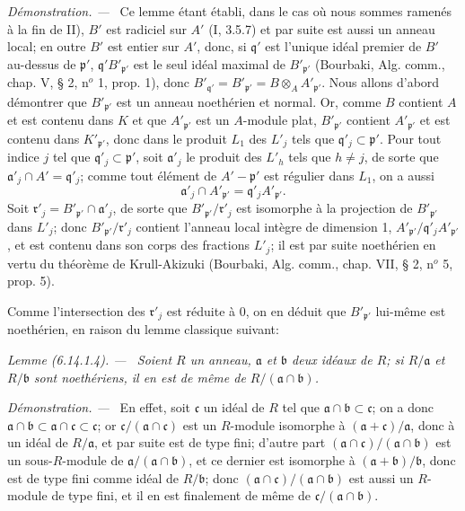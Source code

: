 \documentclass[10pt,oneside]{book}
\newcommand{\oldpage}[2][]{%
  \setcounter{footnote}{0}%
  \marginpar{\scriptsize\textbf{#1}~|~#2}\ignorespaces}
\newenvironment{lemma}[1][]{%
  \par\medskip\noindent\itshape Lemme (#1). ---\ }{\par}
\newenvironment{proof}{%
  \par\medskip\noindent\textit{Démonstration. ---\ }}{\par}
\begin{document}
\begin{proof}
Ce lemme étant établi, dans le cas où nous sommes ramenés à la fin de II),
$B'$ est radiciel sur $A'$ (I, 3.5.7) et par suite est aussi un anneau
local; en outre $B'$ est entier sur $A'$, donc, si $\mathfrak q'$ est
l'unique idéal premier de $B'$ au-dessus de $\mathfrak p'$,
$\mathfrak q'B'_{\mathfrak p'}$ est le seul idéal maximal de
$B'_{\mathfrak p'}$ (Bourbaki, Alg. comm., chap. V, § 2, n$^o$ 1, prop.
1), donc $B'_{\mathfrak q'}=B'_{\mathfrak p'}=B\otimes_A
A'_{\mathfrak p'}$. Nous allons d'abord démontrer que
$B'_{\mathfrak p'}$ est un anneau noethérien et normal. Or, comme $B$
contient $A$ et est contenu dans $K$ et que $A'_{\mathfrak p'}$ est un
$A$-module plat, $B'_{\mathfrak p'}$ contient $A'_{\mathfrak p'}$ et est
contenu dans $K'_{\mathfrak p'}$, donc dans le produit $L_1$ des $L'_j$
tels que $\mathfrak q'_j\subset\mathfrak p'$. Pour tout indice $j$ tel que
$\mathfrak q'_j\subset\mathfrak p'$, soit $\mathfrak a'_j$ le produit des
$L'_h$ tels que $h\neq j$, de sorte que
$\mathfrak a'_j\cap A'=\mathfrak q'_j$; comme tout élément de
$A'-\mathfrak p'$ est régulier dans $L_1$, on a aussi
\[
\mathfrak a'_j\cap A'_{\mathfrak p'}=
\mathfrak q'_jA'_{\mathfrak p'}.
\]
Soit $\mathfrak r'_j=B'_{\mathfrak p'}\cap\mathfrak a'_j$, de sorte que
$B'_{\mathfrak p'}/\mathfrak r'_j$ est isomorphe à la projection de
$B'_{\mathfrak p'}$ dans $L'_j$; donc $B'_{\mathfrak p'}/\mathfrak r'_j$
contient l'anneau local intègre de dimension 1,
$A'_{\mathfrak p'}/\mathfrak q'_jA'_{\mathfrak p'}$, et est contenu dans
son corps des fractions $L'_j$; il est par suite noethérien en vertu du
théorème de Krull-Akizuki (Bourbaki, Alg. comm., chap. VII, § 2, n$^o$ 5,
prop. 5).

\oldpage[IV-2]{173}
Comme l'intersection des $\mathfrak r'_j$ est réduite à 0, on en déduit que
$B'_{\mathfrak p'}$ lui-même est noethérien, en raison du lemme classique
suivant:

\begin{lemma}[6.14.1.4]
\label{IV.2.s6.14.1.4-fr}
Soient $R$ un anneau, $\mathfrak a$ et $\mathfrak b$ deux idéaux de $R$; si
$R/\mathfrak a$ et $R/\mathfrak b$ sont noethériens, il en est de même de
$R/(\mathfrak a\cap\mathfrak b)$.
\end{lemma}

\begin{proof}
En effet, soit $\mathfrak c$ un idéal de $R$ tel que
$\mathfrak a\cap\mathfrak b\subset\mathfrak c$; on a donc
$\mathfrak a\cap\mathfrak b\subset\mathfrak a\cap\mathfrak c\subset
\mathfrak c$; or $\mathfrak c/(\mathfrak a\cap\mathfrak c)$ est un
$R$-module isomorphe à $(\mathfrak a+\mathfrak c)/\mathfrak a$, donc à un
idéal de $R/\mathfrak a$, et par suite est de type fini; d'autre part
$(\mathfrak a\cap\mathfrak c)/(\mathfrak a\cap\mathfrak b)$ est un
sous-$R$-module de $\mathfrak a/(\mathfrak a\cap\mathfrak b)$, et ce
dernier est isomorphe à $(\mathfrak a+\mathfrak b)/\mathfrak b$, donc est
de type fini comme idéal de $R/\mathfrak b$; donc
$(\mathfrak a\cap\mathfrak c)/(\mathfrak a\cap\mathfrak b)$ est aussi un
$R$-module de type fini, et il en est finalement de même de
$\mathfrak c/(\mathfrak a\cap\mathfrak b)$.
\end{proof}


\end{proof}
\end{document}
